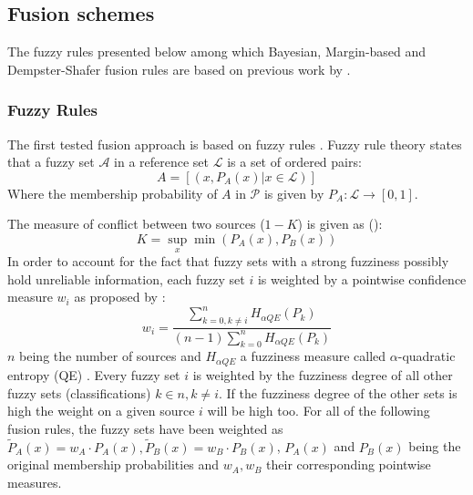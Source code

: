 \documentclass[10pt]{article}
\begin{document}
\subsection{Fusion schemes}\label{sec:fusion}

The fuzzy rules presented below among which Bayesian, Margin-based and Dempster-Shafer fusion rules are based on previous work by \cite{ouerghemmi_two-step_2017}.
\subsubsection{Fuzzy Rules}\label{sec:fuzzyLogic}
The first tested fusion approach is based on fuzzy rules \cite{zadeh_fuzzy_1965}. Fuzzy rule theory states that a fuzzy set $\mathcal{A}$ in a reference set $\mathcal{L}$ is a set of ordered pairs:
\begin{equation}
    A=[(x,P_A(x)|x\in \mathcal{L})]
\end{equation}
Where the membership probability of $A$ in $\mathcal{P}$ is given by $P_A:\mathcal{L}\rightarrow[0,1]$.

The measure of conflict between two sources ($1-K$) is given as (\cite{ouerghemmi_two-step_2017,dubois_possibility}):
\begin{equation}
    K=\sup_x\min(P_A(x), P_B(x))
\end{equation}
In order to account for the fact that fuzzy sets with a strong fuzziness possibly hold unreliable information, each fuzzy set $i$ is weighted by a pointwise confidence measure $w_i$ as proposed by \cite{fauvel_decision_fusion}:
\begin{equation}
    w_i=\frac{\sum_{k=0,k\neq i}^{n}H_{\alpha QE}(P_k)}{(n-1)\sum_{k=0}^{n}H_{\alpha QE}(P_k)}
\end{equation}
$n$ being the number of sources and $H_{\alpha QE}$ a fuzziness measure called $\alpha$-quadratic entropy (QE) \parencite{pal_measuring_1994}. Every fuzzy set $i$ is weighted by the fuzziness degree of all other fuzzy sets (classifications) $k\in n,k\neq i$. If the fuzziness degree of the other sets is high the weight on a given source $i$ will be high too. For all of the following fusion rules, the fuzzy sets have been weighted as $\tilde{P}_A(x)=w_A\cdot P_A(x), \tilde{P}_B(x)=w_B\cdot P_B(x)$, $P_A(x)$ and $P_B(x)$ being the original membership probabilities and $w_A, w_B$ their corresponding pointwise measures.\\
\end{document}
